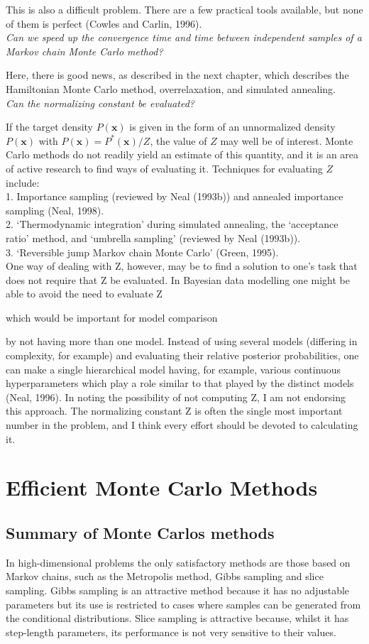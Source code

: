 \documentclass[a4paper,11pt]{article}
\newcommand{\vect}[1]{\boldsymbol{\mathbf{#1}}}
\numberwithin{equation}{section}
\begin{document}
{This is also a difficult problem. There are a few practical tools available, but
none of them is perfect (Cowles and Carlin, 1996).
$$
$$
{\it Can we speed up the convergence time and time between independent samples of a Markov chain Monte Carlo method? }

Here, there is
good news, as described in the next chapter, which describes the Hamiltonian
Monte Carlo method, overrelaxation, and simulated annealing.
$$
$$
{\it Can the normalizing constant be evaluated?}

If the target density $P(\vect x)$ is given in the form of an unnormalized density
 $P(\vect x)$ with  $P(\vect x) = P^*(\vect x) /Z $, the value of $Z$ may well be of interest. Monte
Carlo methods do not readily yield an estimate of this quantity, and it is an
area of active research to find ways of evaluating it. Techniques for evaluating
$Z$ include:
$$
$$
1. Importance sampling (reviewed by Neal (1993b)) and annealed importance
sampling (Neal, 1998).
$$
$$
2. `Thermodynamic integration' during simulated annealing, the `acceptance ratio' method, and `umbrella sampling' (reviewed by Neal (1993b)).
$$
$$
3. `Reversible jump Markov chain Monte Carlo' (Green, 1995).
$$
$$
One way of dealing with Z, however, may be to find a solution to one's
task that does not require that Z be evaluated. In Bayesian data modelling
one might be able to avoid the need to evaluate Z { which would be important
for model comparison { by not having more than one model. Instead of using
several models (differing in complexity, for example) and evaluating their relative
posterior probabilities, one can make a single hierarchical model having,
for example, various continuous hyperparameters which play a role similar to
that played by the distinct models (Neal, 1996). In noting the possibility of
not computing Z, I am not endorsing this approach. The normalizing constant
Z is often the single most important number in the problem, and I think every
effort should be devoted to calculating it.


\section{Efficient Monte Carlo Methods}

\subsection{Summary of Monte Carlos methods }

In high-dimensional problems the only satisfactory methods are those
based on Markov chains, such as the Metropolis method, Gibbs sampling
and slice sampling. Gibbs sampling is an attractive method because
it has no adjustable parameters but its use is restricted to cases
where samples can be generated from the conditional distributions. Slice
sampling is attractive because, whilst it has step-length parameters, its
performance is not very sensitive to their values.



}}}
\end{document}
